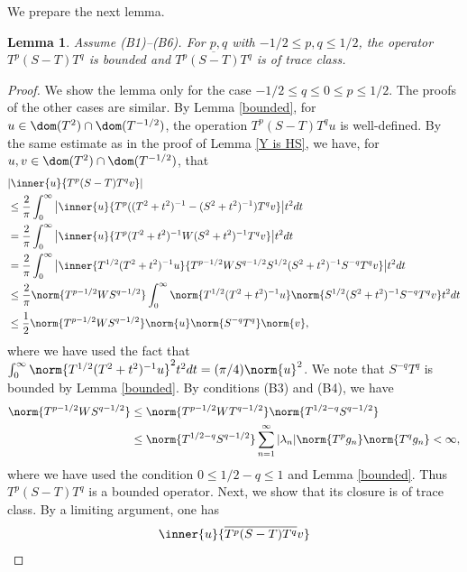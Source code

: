 \documentclass[12pt,draft]{article}
\theoremstyle{plain}
\newtheorem{lem}[theorem]{\bf Lemma}
\numberwithin{equation}{section}
\theoremstyle{remark}
\begin{document}
We prepare the next lemma.
\begin{lem}{\label{tr lem}}
Assume (B1)--(B6).
For $p,q$ with $-1/2\leq p,q\leq 1/2$, the operator $T^p(S-T)T^q$ is bounded and $\overline{T^p(S-T)T^q}$ is of trace class. 
\end{lem}
\begin{proof}
We show the lemma only for the case $-1/2\leq q\leq 0 \leq p\leq 1/2$.
The proofs of the other cases are similar.
By Lemma \ref{bounded}, for $u\in \dom(T^2)\cap \dom(T^{-1/2})$, the operation $T^p(S-T)T^qu$ is well-defined.
  By the same estimate as in the proof of Lemma \ref{Y is HS}, we have, for $u, v\in \dom(T^2)\cap \dom(T^{-1/2})$, that
\begin{align*}
& |\inner{u}{T^p(S-T)T^q v}|  \\
&\leq \frac{2}{\pi}\int_0^\infty \big| \inner{u}{T^p ((T^2+t^2)^{-1}-(S^2+t^2)^{-1})T^q v} \big| t^2dt \\
&= \frac{2}{\pi}\int_0^\infty \big| \inner{u}{T^p (T^2+t^2)^{-1}W(S^2+t^2)^{-1} T^q v} \big| t^2dt \\
&= \frac{2}{\pi}\int_0^\infty \big| \inner{T^{1/2}(T^2+t^2)^{-1}u}{T^{p-1/2} WS^{q-1/2} S^{1/2}(S^2+t^2)^{-1} S^{-q}T^q v} \big| t^2dt \\
&\leq \frac{2}{\pi} \norm{T^{p-1/2} WS^{q-1/2}} \int_0^\infty \norm{T^{1/2}(T^2+t^2)^{-1}u} \norm{S^{1/2}(S^2+t^2)^{-1} S^{-q}T^q v}  t^2dt \\
&\leq \frac{1}{2} \norm{T^{p-1/2} WS^{q-1/2}} \norm{u} \norm{S^{-q}T^q} \norm{v},
\end{align*}
where we have used the fact that $\int_0^\infty \norm{T^{1/2}(T^2+t^2)^{-1}u}^2t^2dt = (\pi/4)\norm{u}^2$.
We note that $S^{-q}T^q$ is bounded by Lemma \ref{bounded}.
By conditions (B3) and (B4), we have
\begin{align*}
 \norm{T^{p-1/2} WS^{q-1/2}} 
& \leq \norm{T^{p-1/2} WT^{q-1/2}} \norm{T^{1/2-q}S^{q-1/2}} \notag \\
& \leq \norm{T^{1/2-q}S^{q-1/2}} \sum_{n=1}^\infty |\lambda_n| \norm{T^pg_n} \norm{T^qg_n} < \infty, 
\end{align*}
where we have used the condition $0\leq 1/2 - q \leq 1$ and Lemma \ref{bounded}.
Thus $T^p(S-T)T^q$ is a bounded operator. Next, we show that its closure is of trace class.
By a limiting argument, one has
\begin{align}
& \inner{u}{\overline{T^p(S-T)T^q}v} \notag\\

\end{align}
\end{proof}
\end{document}
